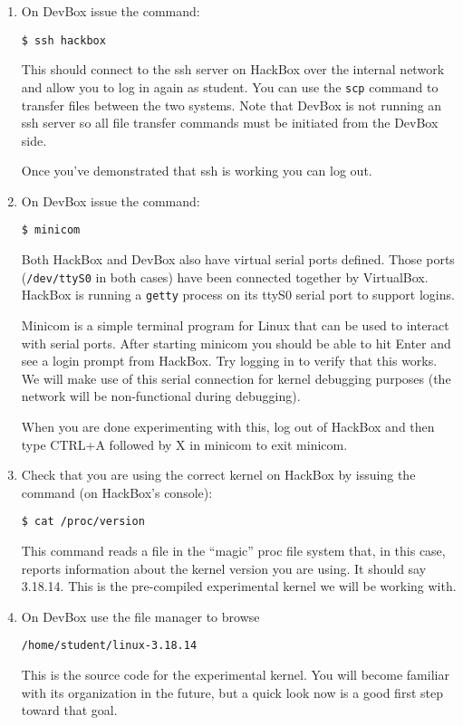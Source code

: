 \documentclass[twocolumn]{article}
\begin{document}
\begin{enumerate}
\item On DevBox issue the command:
\begin{Verbatim}
$ ssh hackbox
\end{Verbatim}
  This should connect to the ssh server on HackBox over the internal network and allow you to
  log in again as student. You can use the \texttt{scp} command to transfer files between the
  two systems. Note that DevBox is not running an ssh server so all file transfer commands must
  be initiated from the DevBox side.

  Once you've demonstrated that ssh is working you can log out.

\item On DevBox issue the command:
\begin{Verbatim}
$ minicom
\end{Verbatim}
  Both HackBox and DevBox also have virtual serial ports defined. Those ports
  (\texttt{/dev/ttyS0} in both cases) have been connected together by VirtualBox. HackBox is
  running a \texttt{getty} process on its ttyS0 serial port to support logins.

  Minicom is a simple terminal program for Linux that can be used to interact with serial ports.
  After starting minicom you should be able to hit Enter and see a login prompt from HackBox.
  Try logging in to verify that this works. We will make use of this serial connection for
  kernel debugging purposes (the network will be non-functional during debugging).

  When you are done experimenting with this, log out of HackBox and then type CTRL+A followed by
  X in minicom to exit minicom.

\item Check that you are using the correct kernel on HackBox by issuing the command (on
  HackBox's console):
\begin{Verbatim}
$ cat /proc/version
\end{Verbatim}
  This command reads a file in the ``magic'' proc file system that, in this case, reports
  information about the kernel version you are using. It should say 3.18.14. This is the
  pre-compiled experimental kernel we will be working with.

\item On DevBox use the file manager to browse
\begin{Verbatim}
/home/student/linux-3.18.14
\end{Verbatim}
  This is the source code for the experimental kernel. You will become familiar with its
  organization in the future, but a quick look now is a good first step toward that goal.


\end{enumerate}
\end{document}
